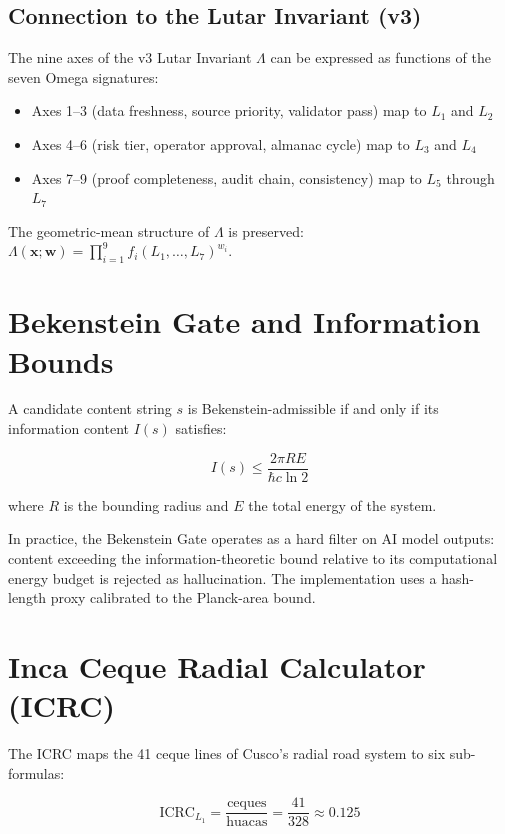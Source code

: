\documentclass[11pt]{article}
\theoremstyle{plain}
\begin{document}
\subsection{Connection to the Lutar Invariant (v3)}

The nine axes of the v3 Lutar Invariant \( \Lambda \) can be expressed as functions of the seven Omega signatures:

\begin{itemize}
  \item Axes 1–3 (data freshness, source priority, validator pass) map to \( L_1 \) and \( L_2 \)
  \item Axes 4–6 (risk tier, operator approval, almanac cycle) map to \( L_3 \) and \( L_4 \)
  \item Axes 7–9 (proof completeness, audit chain, consistency) map to \( L_5 \) through \( L_7 \)
\end{itemize}

The geometric-mean structure of \( \Lambda \) is preserved: \( \Lambda(\mathbf{x}; \mathbf{w}) = \prod_{i=1}^{9} f_i(L_1, \ldots, L_7)^{w_i} \).


\section{Bekenstein Gate and Information Bounds}

A candidate content string \( s \) is Bekenstein-admissible if and only if its information content \( I(s) \) satisfies:

\begin{equation}
I(s) \leq \frac{2\pi R E}{\hbar c \ln 2}
\end{equation}

where \( R \) is the bounding radius and \( E \) the total energy of the system.

In practice, the Bekenstein Gate operates as a hard filter on AI model outputs: content exceeding the information-theoretic bound relative to its computational energy budget is rejected as hallucination. The implementation uses a hash-length proxy calibrated to the Planck-area bound.


\section{Inca Ceque Radial Calculator (ICRC)}

The ICRC maps the 41 ceque lines of Cusco's radial road system to six sub-formulas:

\begin{equation}
\text{ICRC}_{L_1} = \frac{\text{ceques}}{\text{huacas}} = \frac{41}{328} \approx 0.125
\end{equation}
\end{document}
